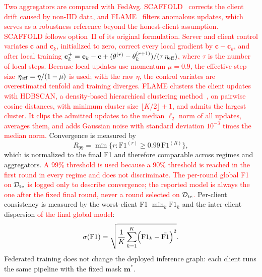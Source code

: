 \documentclass[conference]{IEEEtran}
\begin{document}
\textcolor{red}{Two aggregators are compared with FedAvg.
SCAFFOLD~\cite{karimireddy2020scaffold} corrects the client drift
caused by non-IID data, and FLAME~\cite{nguyen2022flame} filters
anomalous updates, which serves as a robustness reference beyond the
honest-client assumption. SCAFFOLD follows
option~II of its original formulation. Server and client control variates $\mathbf{c}$ and
$\mathbf{c}_k$, initialized to zero, correct every local gradient by
$\mathbf{c}-\mathbf{c}_k$, and after local training
$\mathbf{c}_k^{+}=\mathbf{c}_k-\mathbf{c}+(\theta^{(r)}-
\theta_k^{(r+1)})/(\tau\,\eta_{\rm eff})$, where $\tau$ is the number
of local steps. Because local updates use momentum $\mu=0.9$, the
effective step size $\eta_{\rm eff}=\eta/(1-\mu)$ is used; with the
raw $\eta$, the control variates are overestimated tenfold and
training diverges. FLAME clusters the client
updates with HDBSCAN, a density-based hierarchical clustering
method~\cite{campello2013hdbscan}, on pairwise cosine distances, with minimum cluster size
$\lfloor K/2\rfloor+1$, and admits the largest cluster. It clips the
admitted updates to the median $\ell_2$ norm of all updates, averages
them, and adds Gaussian noise with standard deviation $10^{-3}$ times
the median norm.} Convergence is measured by
\begin{equation}
R_{99}=\min\bigl\{r:\mathrm{F1}^{(r)}\ge
0.99\,\mathrm{F1}^{(R)}\bigr\},
\label{eq:r90}
\end{equation}
which is normalized to the final F1 and therefore comparable across
regimes and aggregators.
\textcolor{red}{A 99\% threshold is used
because a 90\% threshold is reached in the first round in every regime
and does not discriminate.} \textcolor{red}{The per-round global F1 on
$\mathcal{D}_{\rm te}$ is logged only to describe convergence; the
reported model is always the one after the fixed final round, never a
round selected on $\mathcal{D}_{\rm te}$.} Per-client consistency is
measured by the worst-client F1 $\min_k\mathrm{F1}_k$ and the
inter-client dispersion \textcolor{red}{of the final global
model}:
\begin{equation}
\sigma\!\left(\mathrm{F1}\right)=
\sqrt{\frac{1}{K}\sum_{k=1}^{K}
\Bigl(\mathrm{F1}_k-\bar{\mathrm{F1}}\Bigr)^2}.
\label{eq:client_var_round}
\end{equation}
Federated training does not change the deployed inference graph:
each client runs the same pipeline with the fixed mask
$\mathbf{m}^{*}$.

\end{document}
